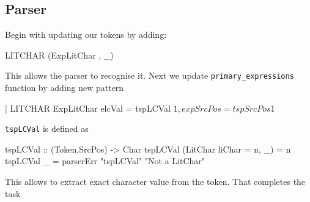 \documentclass{article}
\begin{document}
\subsection{Parser}
\begin{flushleft}
Begin with updating our tokens by adding:
\end{flushleft}
\begin{code}
LITCHAR     { (ExpLitChar {}, _) }
\end{code}
\begin{flushleft}
This allows the parser to recognise it. Next we update \texttt{primary\_expressions} function by adding new pattern
\end{flushleft}
\begin{code}
| LITCHAR
  { ExpLitChar { elcVal = tspLCVal $1, expSrcPos = tspSrcPos $1 } }
\end{code}
\begin{flushleft}
\texttt{tspLCVal} is defined as
\end{flushleft}
\begin{code}
tspLCVal :: (Token,SrcPos) -> Char
tspLCVal (LitChar {liChar = n}, _) = n
tspLCVal _ = parserErr "tspLCVal" "Not a LitChar"
\end{code}
\begin{flushleft}
This allows to extract exact character value from the token. That completes the task
\end{flushleft}
\end{document}

